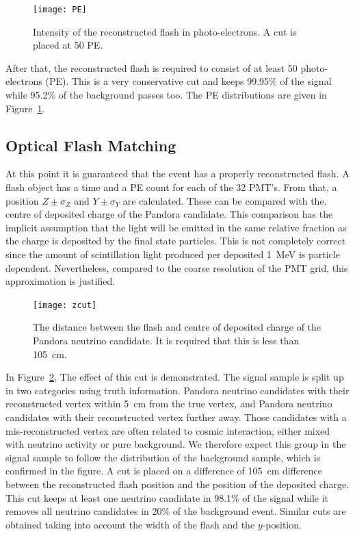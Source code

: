 \begin{figure}[htbp]
\centering
\texttt{[image: PE]}
\caption{Intensity of the reconstructed flash in photo-electrons. A cut is placed at 50 PE.} 
\label{fig:PE}
\end{figure}

After that, the reconstructed flash is required to consist of at least 50 photo-electrons (PE). This is a very conservative cut and keeps 99.95\% of the signal while 95.2\% of the background passes too. The PE distributions are given in Figure~\ref{fig:PE}.


\subsection{Optical Flash Matching}

At this point it is guaranteed that the event has a properly reconstructed flash. A flash object has a time and a PE count for each of the 32 PMT's. From that, a position $Z\pm \sigma_Z$ and $Y\pm \sigma_Y$ are calculated. These can be compared with the. centre of deposited charge of the Pandora candidate. This comparison has the implicit assumption that the light will be emitted in the same relative fraction as the charge is deposited by the final state particles. This is not completely correct since the amount of scintillation light produced per deposited \SI{1}{\MeV} is particle dependent. Nevertheless, compared to the coarse resolution of the PMT grid, this approximation is justified. 

\begin{figure}[htbp]
\centering
\texttt{[image: zcut]}
\caption{The distance between the flash and centre of deposited charge of the Pandora neutrino candidate. It is required that this is less than \SI{105}{\cm}.} 
\label{fig:zcut}
\end{figure}

In Figure~\ref{fig:zcut}, The effect of this cut is demonstrated. The signal sample is split up in two categories using truth information. Pandora neutrino candidates with their reconstructed vertex within \SI{5}{\cm} from the true vertex, and Pandora neutrino candidates with their reconstructed vertex further away. Those candidates with a mis-reconstructed vertex are often related to cosmic interaction, either mixed with neutrino activity or pure background. We therefore expect this group in the signal sample to follow the distribution of the background sample, which is confirmed in the figure. A cut is placed on a difference of \SI{105}{\cm} difference between the reconstructed flash position and the position of the deposited charge. This cut keeps at least one neutrino candidate in 98.1\% of the signal while it removes all neutrino candidates in 20\% of the background event. 
Similar cuts are obtained taking into account the width of the flash and the $y$-position. 

